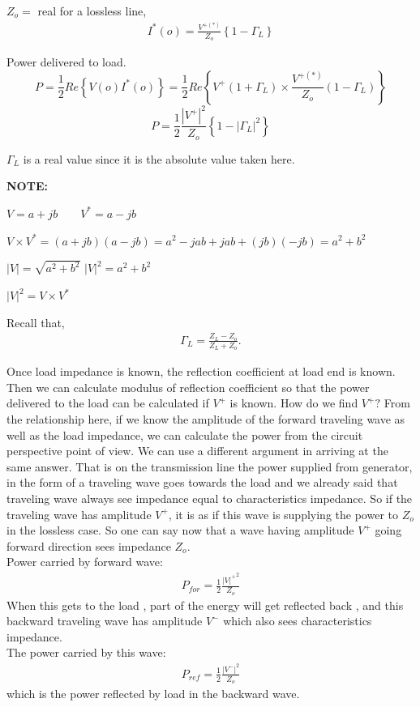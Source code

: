 $Z_o= $ real for a lossless line,
\begin{align*}
I^\ast (o) =\frac{V^{+ (\ast )}}{Z_o}\left\lbrace 1 -\Gamma_L \right\rbrace
\end{align*}

Power delivered to load.
\begin{dmath*}
P= \frac{1}{2} Re\left\lbrace V(o) I^*(o) \right\rbrace = \frac{1}{2} Re\left\lbrace V^+(1+\Gamma_L) \times \frac{V^{+(*)}}{Z_o} (1-\Gamma_L)\right\rbrace
\end{dmath*}
\begin{equation}
P= \frac{1}{2} \frac{|V^+|^2}{Z_o} \left\lbrace 1 -|\Gamma_L|^2 \right\rbrace 
\end{equation}

$\Gamma_L$ is a real value since it is the absolute value taken here.

\textbf{NOTE:} 

$V= a + jb  \quad \quad V^*= a -jb$

$ V\times V^* = ( a + jb)(a-jb)= a^2 - jab + jab + (jb) (-jb)= a^2 + b^2 $

$| V |= \sqrt{a^2 + b^2} $ \quad \quad $|V|^2 = a^2 + b^2 $

$| V |^2 = V \times V^* $ 

Recall that,
\begin{align*}\Gamma_L = \frac{ Z_L -Z_o }{ Z_L + Z_o }.
\end{align*}

Once load impedance is known, the reflection coefficient at load end is known. Then we can calculate modulus of reflection coefficient so that the power delivered to the load can be calculated if $V^+$ is known. How do we find $V^+ ? $ From the relationship here, if we know the amplitude of the forward traveling wave as well as the load impedance, we can calculate the power from the circuit perspective point of view. We can use a different argument in arriving at the same answer. That is on the transmission line the power supplied from generator, in the form of a traveling wave goes towards the load and we already said that traveling wave always see impedance equal to characteristics impedance. So if the traveling wave has amplitude $V^+$, it is as if this wave is supplying the power to $Z_o$ in the lossless case. So one can say now that  a wave having amplitude $V^+$ going forward direction sees impedance $Z_o$.\\
Power carried by forward wave:  
\begin{align*}
P_{for}= \frac{1}{2} \frac{{| V |^+}^2}{Z_o}
\end{align*}
When this gets to the load , part of the energy will get reflected back , and this backward traveling wave has amplitude $V^-$ which also sees characteristics impedance.\\
The power carried by this wave:
\begin{align*}
P_{ref}= \frac{1}{2}\frac{{|V^-|}^2}{Z_o}
\end{align*}
which is the power reflected by load in the backward wave.

